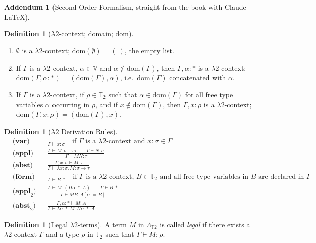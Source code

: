 \documentclass{article}
\theoremstyle{definition}
\newtheorem{definition} [theorem] {Definition}
\newtheorem{addendum}{Addendum}
\newcommand{\1}{\mathbb{1}}
\newcommand{\0}{\mathbb{0}}
\begin{document}
\begin{addendum}[Second Order Formalism, straight from the book with Claude LaTeX]
\begin{definition}[$\lambda2$-context; domain; $\mathrm{dom}$]\,
\begin{enumerate}
  \item $\emptyset$ is a $\lambda2$-context; $\mathrm{dom}(\emptyset) = (\ )$,
        the empty list.
  \item If $\Gamma$ is a $\lambda2$-context, $\alpha \in \mathbb{V}$ and
        $\alpha \notin \mathrm{dom}(\Gamma)$, then $\Gamma, \alpha : *$ is a
        $\lambda2$-context; $\mathrm{dom}(\Gamma, \alpha : *) =
        (\mathrm{dom}(\Gamma), \alpha)$, i.e.\ $\mathrm{dom}(\Gamma)$
        concatenated with $\alpha$.
  \item If $\Gamma$ is a $\lambda2$-context, if $\rho \in \mathbb{T}_2$ such
        that $\alpha \in \mathrm{dom}(\Gamma)$ for all free type variables
        $\alpha$ occurring in $\rho$, and if $x \notin \mathrm{dom}(\Gamma)$,
        then $\Gamma, x : \rho$ is a $\lambda2$-context;
        $\mathrm{dom}(\Gamma, x : \rho) = (\mathrm{dom}(\Gamma), x)$.
\end{enumerate}
\end{definition}

\begin{definition}[$\lambda 2$ Derivation Rules] \,
    \begin{align*}
&\textbf{(var)} && \frac{}{\Gamma \vdash x : \sigma}
   \quad \text{if } \Gamma \text{ is a } \lambda2\text{-context and } x : \sigma \in \Gamma \\[1.5ex]
&\textbf{(appl)} && \frac{\Gamma \vdash M : \sigma \to \tau \qquad \Gamma \vdash N : \sigma}
                         {\Gamma \vdash MN : \tau} \\[1.5ex]
&\textbf{(abst)} && \frac{\Gamma, x : \sigma \vdash M : \tau}
                         {\Gamma \vdash \lambda x : \sigma .\, M : \sigma \to \tau} \\[1.5ex]
&\textbf{(form)} && \frac{}{\Gamma \vdash B : *}
   \quad \text{if } \Gamma \text{ is a } \lambda2\text{-context, } B \in \mathbb{T}_2
   \text{ and all free type variables in } B \text{ are declared in } \Gamma \\[1.5ex]
&\textbf{(appl}_2\textbf{)} && \frac{\Gamma \vdash M : (\Pi \alpha : * .\, A) \qquad \Gamma \vdash B : *}
                         {\Gamma \vdash MB : A[\alpha := B]} \\[1.5ex]
&\textbf{(abst}_2\textbf{)} && \frac{\Gamma, \alpha : * \vdash M : A}
                         {\Gamma \vdash \lambda \alpha : * .\, M : \Pi \alpha : * .\, A}
\end{align*}
\end{definition}


\begin{definition}[Legal $\lambda2$-terms]
A term $M$ in $\Lambda_{\mathbb{T}2}$ is called \emph{legal} if there exists a
$\lambda2$-context $\Gamma$ and a type $\rho$ in $\mathbb{T}_2$ such that
$\Gamma \vdash M : \rho$.
\end{definition}
\end{addendum}
\end{document}
